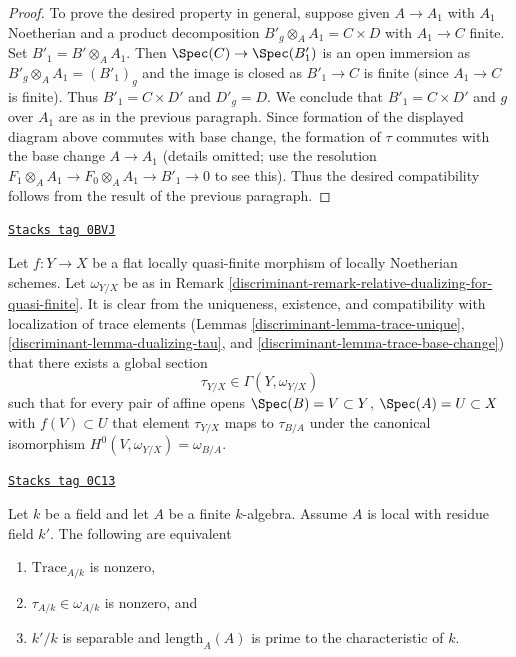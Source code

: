\begin{proof}
\medskip\noindent
To prove the desired property in general, suppose given
$A \to A_1$ with $A_1$ Noetherian and a product decomposition
$B'_g \otimes_A A_1 = C \times D$ with $A_1 \to C$ finite.
Set $B'_1 = B' \otimes_A A_1$. Then $\Spec(C) \to \Spec(B'_1)$
is an open immersion as $B'_g \otimes_A A_1 = (B'_1)_g$ and
the image is closed as $B'_1 \to C$ is finite (since $A_1 \to C$
is finite). Thus $B'_1 = C \times D'$ and $D'_g = D$.
We conclude that $B'_1 = C \times D'$ and $g$ over $A_1$
are as in the previous paragraph.
Since formation of the displayed diagram above
commutes with base change, the formation of $\tau$ commutes
with the base change $A \to A_1$ (details omitted; use the
resolution $F_1 \otimes_A A_1 \to F_0 \otimes_A A_1 \to B'_1 \to 0$
to see this). Thus the desired compatibility follows from the result
of the previous paragraph.
\end{proof}

\begin{remark}
\label{discriminant-remark-relative-dualizing-for-flat-quasi-finite}
\href{https://stacks.math.columbia.edu/tag/0BVJ}{\texttt{Stacks tag 0BVJ}}

Let $f : Y \to X$ be a flat locally quasi-finite morphism of locally
Noetherian schemes. Let $\omega_{Y/X}$ be as in
Remark \ref{discriminant-remark-relative-dualizing-for-quasi-finite}.
It is clear from the uniqueness, existence, and compatibility with
localization of trace elements
(Lemmas \ref{discriminant-lemma-trace-unique}, \ref{discriminant-lemma-dualizing-tau}, and
\ref{discriminant-lemma-trace-base-change})
that there exists a global section
$$
\tau_{Y/X} \in \Gamma(Y, \omega_{Y/X})
$$
such that for every pair of affine opens
$\Spec(B) = V \subset Y$, $\Spec(A) = U \subset X$ with $f(V) \subset U$
that element $\tau_{Y/X}$ maps to $\tau_{B/A}$ under the
canonical isomorphism
$H^0(V, \omega_{Y/X}) = \omega_{B/A}$.
\end{remark}

\begin{lemma}
\label{discriminant-lemma-tau-nonzero}
\href{https://stacks.math.columbia.edu/tag/0C13}{\texttt{Stacks tag 0C13}}

Let $k$ be a field and let $A$ be a finite $k$-algebra. Assume $A$
is local with residue field $k'$. The following are equivalent
\begin{enumerate}
\item $\text{Trace}_{A/k}$ is nonzero,
\item $\tau_{A/k} \in \omega_{A/k}$ is nonzero, and
\item $k'/k$ is separable and $\text{length}_A(A)$ is prime
to the characteristic of $k$.
\end{enumerate}
\end{lemma}

